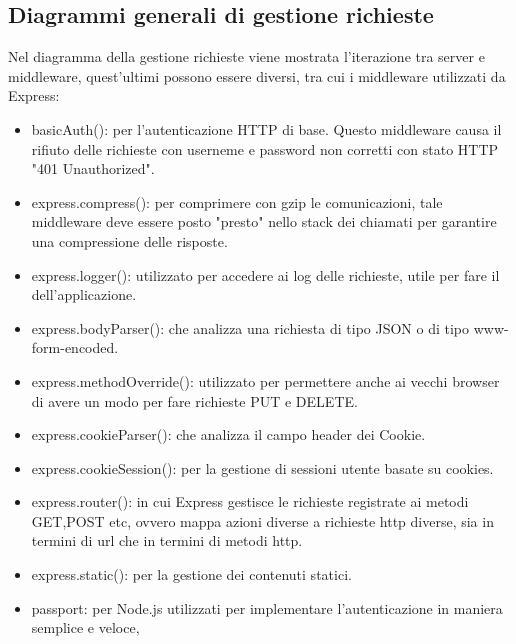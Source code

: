 \subsection{Diagrammi generali di gestione richieste}
Nel diagramma della gestione richieste viene mostrata l'iterazione tra server e middleware, quest'ultimi possono essere diversi, tra cui i middleware utilizzati da Express:
\begin{itemize}
\item{basicAuth()}:  per l'autenticazione HTTP di base. Questo middleware causa il rifiuto delle richieste con userneme e password non corretti con stato HTTP "401 Unauthorized".
\item{express.compress()}:  per comprimere  con gzip le comunicazioni, tale middleware deve essere posto "presto" nello stack dei  chiamati per garantire una compressione delle risposte.
\item{express.logger()}:  utilizzato per accedere ai log delle richieste, utile per fare il
 dell'applicazione.
\item{express.bodyParser()}:  che analizza una richiesta di tipo JSON o di tipo www-form-encoded.
\item{express.methodOverride()}:  utilizzato per permettere anche ai vecchi browser di avere un modo per fare richieste PUT e DELETE.
\item{express.cookieParser()}:  che analizza il campo header dei Cookie.
\item{express.cookieSession()}:  per la gestione di sessioni utente basate su cookies.
\item{express.router()}:  in cui Express gestisce le richieste registrate ai metodi GET,POST etc, ovvero mappa azioni diverse a richieste http diverse, sia in termini di url che in termini di metodi http.
\item{express.static()}:  per la gestione dei contenuti statici.
\item{passport}:  per Node.js utilizzati per implementare l'autenticazione in maniera semplice e veloce,

\end{itemize}
